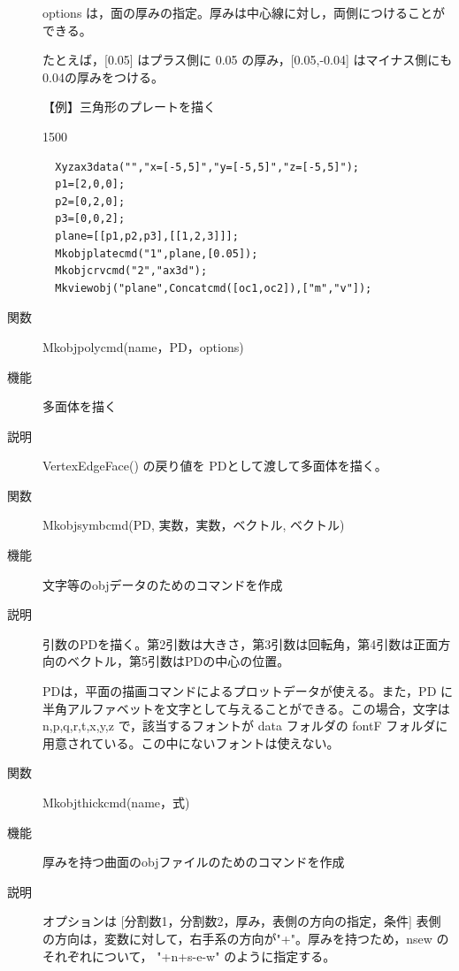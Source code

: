 \documentclass[papersize,a4paper,12pt,uplatex]{jsarticle}
\begin{document}
\begin{description}
options は，面の厚みの指定。厚みは中心線に対し，両側につけることができる。

たとえば，[0.05] はプラス側に 0.05 の厚み，[0.05,-0.04] はマイナス側にも0.04の厚みをつける。

\vspace{\baselineskip}
【例】三角形のプレートを描く

\begin{layer}{150}{0}
\end{layer}
\begin{verbatim}
  Xyzax3data("","x=[-5,5]","y=[-5,5]","z=[-5,5]");
  p1=[2,0,0];
  p2=[0,2,0];
  p3=[0,0,2];
  plane=[[p1,p2,p3],[[1,2,3]]];
  Mkobjplatecmd("1",plane,[0.05]);
  Mkobjcrvcmd("2","ax3d");
  Mkviewobj("plane",Concatcmd([oc1,oc2]),["m","v"]); 
  \end{verbatim}

\vspace{\baselineskip}
\hypertarget{mkobjpolycmd}{}
\item[関数]  Mkobjpolycmd(name，PD，options)
\item[機能]  多面体を描く
\item[説明]  VertexEdgeFace() の戻り値を PDとして渡して多面体を描く。

\vspace{\baselineskip}
\hypertarget{mkobjsymbcmd}{}
\item[関数]  Mkobjsymbcmd(PD, 実数，実数，ベクトル, ベクトル)
\item[機能]  文字等のobjデータのためのコマンドを作成
\item[説明]  引数のPDを描く。第2引数は大きさ，第3引数は回転角，第4引数は正面方向のベクトル，第5引数はPDの中心の位置。

PDは，平面の描画コマンドによるプロットデータが使える。また，PD に半角アルファベットを文字として与えることができる。この場合，文字は n,p,q,r,t,x,y,z で，該当するフォントが data フォルダの fontF フォルダに用意されている。この中にないフォントは使えない。

\vspace{\baselineskip}
\hypertarget{mkobjthickcmd}{}
\item[関数]  Mkobjthickcmd(name，式)
\item[機能]  厚みを持つ曲面のobjファイルのためのコマンドを作成
\item[説明]  オプションは [分割数1，分割数2，厚み，表側の方向の指定，条件]
表側の方向は，変数に対して，右手系の方向が"+"。厚みを持つため，nsew のそれぞれについて，
"+n+s-e-w" のように指定する。


\end{description}
\end{document}
